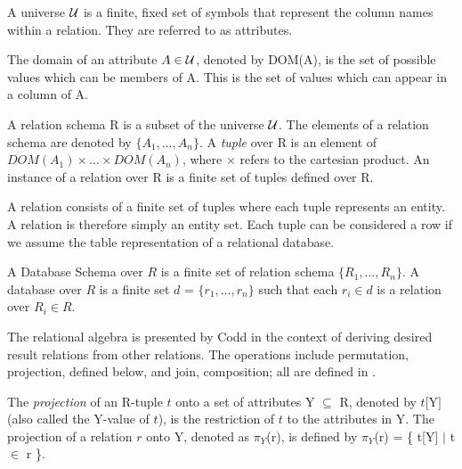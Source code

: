 \begin{definition}[Universe]
\begin{rm}
A universe $\cal U$ is a finite, fixed set of symbols that represent the 
column names within a relation.  They are referred to as attributes.
\end{rm}
\end{definition}


\begin{definition}
\begin{rm}
The domain of an attribute $A \in \cal U$, denoted by DOM(A), is the set
of possible values which can be members of A.  This is the set
of values which can appear in a column of A.
\end{rm}
\end{definition}

\begin{definition}
\begin{rm}
A relation schema R is a subset of the universe $\cal U$.  The elements
of a relation schema are denoted by $\{ A_1, \ldots, A_n \}$.
A {\em tuple} over R is an element of $DOM(A_1) \times \ldots \times
DOM(A_n)$, where $\times$ refers to the cartesian product.  An instance
of a relation over R is a finite set of tuples defined over R.
\end{rm}
\end{definition}

A relation consists of a finite set of tuples where each tuple
represents an entity.  A relation is therefore simply an entity set. 
Each tuple can be considered a row if we assume
the table representation of a relational database.

\begin{definition}
\begin{rm}
A Database Schema over $R$ is a finite set of relation schema $\{ R_1,
\ldots, R_n \}$.  A database over $R$ is a finite set $d$ = $\{ r_1,
\ldots, r_n \}$ such that each $r_i \in d$ is a relation over $R_i \in
R$.
\end{rm}
\end{definition}

The relational algebra is presented by Codd \cite{cod70} in the context of
deriving desired result relations from other relations.  The operations include
permutation, projection, defined below, and join, composition;  all
are defined in \cite{databasefound,atze93,Date95,Maier83,Ullm88}.

\begin{definition}[Projection]
\begin{rm}
The {\em projection } of an R-tuple $t$ onto a set of attributes Y $\subseteq$
R, denoted by $t[$Y$]$ (also called the Y-value of $t$), is the
restriction of $t$ to the attributes in Y.  The projection of a
relation $r$ onto Y, denoted as $\pi_Y$(r),
is defined by $\pi_Y$(r) = \{ t[Y] $\mid$ t $\in$ r \}.
\end{rm}
\end{definition}

